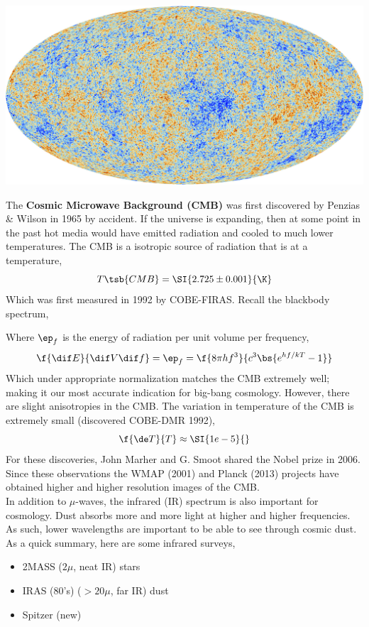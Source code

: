 \documentclass{article}
\begin{document}
\begin{center}
    \includegraphics[width=.6\textwidth]{figures/Planck_CMB.jpg}
\end{center}

The \textbf{Cosmic Microwave Background (CMB)} was first discovered by Penzias \& Wilson in 1965 by accident. If the universe is expanding, then at some point in the past hot media would have emitted radiation and cooled to much lower temperatures. The CMB is a isotropic source of radiation that is at a temperature,
\[ T\tsb{CMB} = \SI{2.725 \pm 0.001}{\K} \]
Which was first measured in 1992 by COBE-FIRAS. Recall the blackbody spectrum,
\begin{center}
\end{center}

Where $\ep_f$ is the energy of radiation per unit volume per frequency,
\[ \f{\dif E}{ \dif V \dif f} = \ep_f = \f{8\pi h f^3}{c^3\bs{e^{hf/kT} - 1}} \]
Which under appropriate normalization matches the CMB extremely well; making it our most accurate indication for big-bang cosmology. However, there are slight anisotropies in the CMB. The variation in temperature of the CMB is extremely small (discovered COBE-DMR 1992),
\[ \f{\de T}{T} \approx \SI{1e-5}{} \]
For these discoveries, John Marher and G. Smoot shared the Nobel prize in 2006. Since these observations the WMAP (2001) and Planck (2013) projects have obtained higher and higher resolution images of the CMB. \\

In addition to $\mu$-waves, the infrared (IR) spectrum is also important for cosmology. Dust absorbs more and more light at higher and higher frequencies. As such, lower wavelengths are important to be able to see through cosmic dust. As a quick summary, here are some infrared surveys,
\begin{itemize}
    \item 2MASS ($2\mu$, neat IR) stars
    \item IRAS (80's) ($>20\mu$, far IR) dust
    \item Spitzer (new)
\end{itemize}
\end{document}
